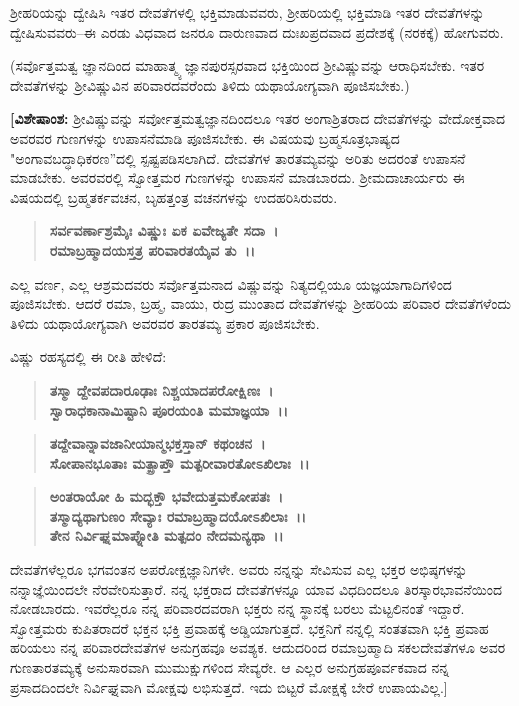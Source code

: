 ಶ‍್ರೀಹರಿಯನ್ನು ದ್ವೇಷಿಸಿ ಇತರ ದೇವತೆಗಳಲ್ಲಿ ಭಕ್ತಿಮಾಡುವವರು, ಶ‍್ರೀಹರಿಯಲ್ಲಿ ಭಕ್ತಿಮಾಡಿ ಇತರ ದೇವತೆಗಳನ್ನು ದ್ವೇಷಿಸುವವರು–ಈ ಎರಡು ವಿಧವಾದ ಜನರೂ ದಾರುಣವಾದ ದುಃಖಪ್ರದವಾದ ಪ್ರದೇಶಕ್ಕೆ (ನರಕಕ್ಕೆ) ಹೋಗುವರು.

(ಸರ್ವೊತ್ತಮತ್ವ ಜ್ಞಾನದಿಂದ ಮಾಹಾತ್ಮ್ಯ ಜ್ಞಾನಪುರಸ್ಸರವಾದ ಭಕ್ತಿಯಿಂದ ಶ‍್ರೀವಿಷ್ಣುವನ್ನು ಆರಾಧಿಸಬೇಕು. ಇತರ ದೇವತೆಗಳನ್ನು ಶ‍್ರೀವಿಷ್ಣುವಿನ ಪರಿವಾರದವರೆಂದು ತಿಳಿದು ಯಥಾಯೋಗ್ಯವಾಗಿ ಪೂಜಿಸಬೇಕು.)

\textbf{[ವಿಶೇಷಾಂಶ:} ಶ‍್ರೀವಿಷ್ಣುವನ್ನು ಸರ್ವೋತ್ತಮತ್ವಜ್ಞಾನದಿಂದಲೂ ಇತರ ಅಂಗಾಶ್ರಿತರಾದ ದೇವತೆಗಳನ್ನು ವೇದೋಕ್ತವಾದ ಅವರವರ ಗುಣಗಳನ್ನು ಉಪಾಸನೆಮಾಡಿ ಪೂಜಿಸಬೇಕು. ಈ ವಿಷಯವು ಬ್ರಹ್ಮಸೂತ್ರಭಾಷ್ಯದ "ಅಂಗಾವಬದ್ಧಾಧಿಕರಣ”ದಲ್ಲಿ ಸ್ಪಷ್ಟಪಡಿಸಲಾಗಿದೆ. ದೇವತೆ\-ಗಳ ತಾರತಮ್ಯವನ್ನು ಅರಿತು ಅದರಂತೆ ಉಪಾಸನೆ ಮಾಡಬೇಕು. ಅವರವರಲ್ಲಿ ಸ್ವೋತ್ತಮರ ಗುಣಗಳನ್ನು ಉಪಾಸನೆ ಮಾಡಬಾರದು. ಶ‍್ರೀಮದಾಚಾರ್ಯರು ಈ ವಿಷಯ\-ದಲ್ಲಿ ಬ್ರಹ್ಮತರ್ಕವಚನ, ಬೃಹತ್ತಂತ್ರ ವಚನಗಳನ್ನು ಉದಹರಿಸಿರುವರು.

\begin{verse}
\textbf{ಸರ್ವವರ್ಣಾಶ್ರಮೈಃ ವಿಷ್ಣುಃ ಏಕ ಏವೇಜ್ಯತೇ ಸದಾ~।}\\\textbf{ರಮಾಬ್ರಹ್ಮಾದಯಸ್ತತ್ರ ಪರಿವಾರತಯೈವ ತು~।।} 
\end{verse}

ಎಲ್ಲ ವರ್ಣ, ಎಲ್ಲ ಆಶ್ರಮದವರು ಸರ್ವೊತ್ತಮನಾದ ವಿಷ್ಣುವನ್ನು ನಿತ್ಯದಲ್ಲಿಯೂ ಯಜ್ಞಯಾಗಾದಿಗಳಿಂದ ಪೂಜಿಸಬೇಕು. ಆದರೆ ರಮಾ, ಬ್ರಹ್ಮ, ವಾಯು, ರುದ್ರ ಮುಂತಾದ ದೇವತೆ\-ಗಳನ್ನು ಶ‍್ರೀಹರಿಯ ಪರಿವಾರ ದೇವತೆಗಳೆಂದು ತಿಳಿದು ಯಥಾಯೋಗ್ಯವಾಗಿ ಅವರವರ ತಾರತಮ್ಯ ಪ್ರಕಾರ ಪೂಜಿಸಬೇಕು.

\begin{flushleft}
ವಿಷ್ಣು ರಹಸ್ಯದಲ್ಲಿ ಈ ರೀತಿ ಹೇಳಿದೆ: 
\end{flushleft}

\begin{verse}
\textbf{ತಸ್ಮಾ ದ್ದೇವಪದಾರೂಢಾಃ ನಿಶ್ಚಯಾದಪರೋಕ್ಷಿಣಃ~।}\\\textbf{ಸ್ವಾರಾಧಕಾನಾಮಿಷ್ಟಾನಿ ಪೂರಯಂತಿ ಮಮಾಜ್ಞಯಾ~।। }
\end{verse}

\begin{verse}
\textbf{ತದ್ದೇವಾನ್ನಾವಜಾನೀಯಾನ್ಮಭಕ್ತಸ್ತಾನ್ ಕಥಂಚನ~।}\\\textbf{ಸೋಪಾನಭೂತಾಃ ಮತ್ಪ್ರಾಪ್ತೌ ಮತ್ಪರೀವಾರತೋಽಖಿಲಾಃ~।।} 
\end{verse}

\begin{verse}
\textbf{ಅಂತರಾಯೋ ಹಿ ಮದ್ಭಕ್ತೌ ಭವೇದುತ್ತಮಕೋಪತಃ~।}\\\textbf{ತಸ್ಮಾದ್ಯಥಾಗುಣಂ ಸೇವ್ಯಾಃ ರಮಾಬ್ರಹ್ಮಾದಯೋಽಖಿಲಾಃ~।। }\\\textbf{ತೇನ ನಿರ್ವಿಘ್ನಮಾಪ್ನೋತಿ ಮತ್ಪದಂ ನೇದಮನ್ಯಥಾ~।।}
\end{verse}

ದೇವತೆಗಳೆಲ್ಲರೂ ಭಗವಂತನ ಅಪರೋಕ್ಷಜ್ಞಾನಿಗಳೇ. ಅವರು ನನ್ನನ್ನು ಸೇವಿಸುವ ಎಲ್ಲ ಭಕ್ತರ ಅಭಿಷ್ಠಗಳನ್ನು ನನ್ನಾಜ್ಞೆಯಿಂದಲೇ ನೆರವೇರಿಸುತ್ತಾರೆ. ನನ್ನ ಭಕ್ತರಾದ ದೇವತೆ\-ಗಳನ್ನೂ ಯಾವ ವಿಧದಿಂದಲೂ ತಿರಸ್ಕಾರಭಾವನೆಯಿಂದ ನೋಡಬಾರದು. ಇವರೆಲ್ಲರೂ ನನ್ನ ಪರಿವಾರದವರಾಗಿ ಭಕ್ತರು ನನ್ನ ಸ್ಥಾನಕ್ಕೆ ಬರಲು ಮೆಟ್ಟಲಿನಂತೆ ಇದ್ದಾರೆ. ಸ್ವೋತ್ತಮರು ಕುಪಿತರಾದರೆ ಭಕ್ತನ ಭಕ್ತಿ ಪ್ರವಾಹಕ್ಕೆ ಅಡ್ಡಿಯಾಗುತ್ತದೆ. ಭಕ್ತನಿಗೆ ನನ್ನಲ್ಲಿ ಸಂತತವಾಗಿ ಭಕ್ತಿ ಪ್ರವಾಹ ಹರಿಯಲು ನನ್ನ ಪರಿವಾರದೇವತೆಗಳ ಅನುಗ್ರಹವೂ ಅವಶ್ಯಕ. ಆದುದರಿಂದ ರಮಾಬ್ರಹ್ಮಾದಿ ಸಕಲದೇವತೆಗಳೂ ಅವರ ಗುಣತಾರತಮ್ಯಕ್ಕೆ ಅನುಸಾರವಾಗಿ ಮುಮುಕ್ಷುಗಳಿಂದ ಸೇವ್ಯರೇ. ಆ ಎಲ್ಲರ ಅನುಗ್ರಹಪೂರ್ವಕವಾದ ನನ್ನ ಪ್ರಸಾದದಿಂದಲೇ ನಿರ್ವಿಘ್ನವಾಗಿ ಮೋಕ್ಷವು ಲಭಿಸುತ್ತದೆ. ಇದು ಬಿಟ್ಟರೆ ಮೋಕ್ಷಕ್ಕೆ ಬೇರೆ ಉಪಾಯವಿಲ್ಲ.]

